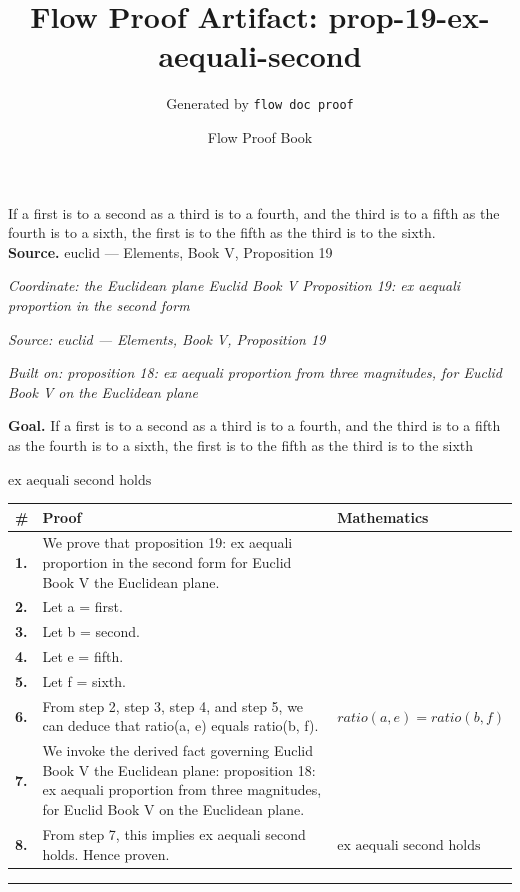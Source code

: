 \documentclass[11pt]{article}
\title{Flow Proof Artifact: prop-19-ex-aequali-second}
\author{Generated by \texttt{flow doc proof}}
\date{Flow Proof Book}
\theoremstyle{definition}
\begin{document}
\maketitle
If a first is to a second as a third is to a fourth, and the third is to a fifth as the fourth is to a sixth, the first is to the fifth as the third is to the sixth.\\[0.5em]
\textbf{Source.} euclid — Elements, Book V, Proposition 19\\[0.5em]
\bigskip
{}\par
\smallskip\noindent\textit{Coordinate: the Euclidean plane \cdot Euclid Book V \cdot Proposition 19: ex aequali proportion in the second form}\par
\smallskip\noindent\textit{Source: euclid — Elements, Book V, Proposition 19}\par
\smallskip\noindent\textit{Built on: proposition 18: ex aequali proportion from three magnitudes, for Euclid Book V on the Euclidean plane}\par
\medskip
\noindent\textbf{Goal.} If a first is to a second as a third is to a fourth, and the third is to a fifth as the fourth is to a sixth, the first is to the fifth as the third is to the sixth\par
\noindent$\displaystyle \text{ex aequali second holds}$\par
\medskip
\noindent
\begin{tabular}{@{} >{\raggedright\arraybackslash}p{} >{\raggedright\arraybackslash}p{} >{\raggedleft\arraybackslash}p{} @{}}
\textbf{\#} & \textbf{Proof} & \textbf{Mathematics} \\
\midrule
\textbf{1.} & We prove that proposition 19: ex aequali proportion in the second form for Euclid Book V the Euclidean plane. & \\[0.45em]
\textbf{2.} & Let a = first. & \\[0.45em]
\textbf{3.} & Let b = second. & \\[0.45em]
\textbf{4.} & Let e = fifth. & \\[0.45em]
\textbf{5.} & Let f = sixth. & \\[0.45em]
\textbf{6.} & From step 2, step 3, step 4, and step 5, we can deduce that ratio(a, e) equals ratio(b, f). & $\displaystyle ratio(a, e) = ratio(b, f)$ \\[0.45em]
\textbf{7.} & We invoke the derived fact governing Euclid Book V the Euclidean plane: proposition 18: ex aequali proportion from three magnitudes, for Euclid Book V on the Euclidean plane. & \\[0.45em]
\textbf{8.} & From step 7, this implies ex aequali second holds. Hence proven. & $\displaystyle \text{ex aequali second holds}$ \\[0.45em]
\bottomrule
\end{tabular}
\label{thm:Geometry-Euclid Book V-proposition_19_ex_aequali_proportion_in_the_second_form}
\par\medskip\hrule
\end{document}
